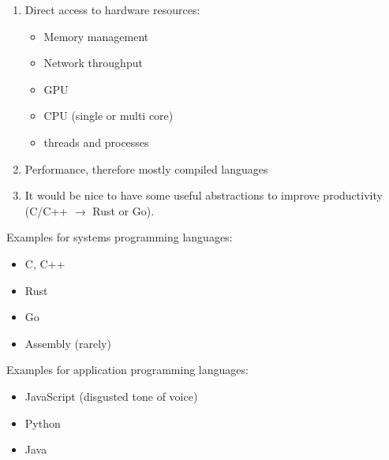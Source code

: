 \begin{enumerate}
    \item Direct access to hardware resources:
          \begin{itemize}
              \item Memory management
              \item Network throughput
              \item GPU
              \item CPU (single or multi core)
              \item threads and processes
          \end{itemize}
    \item Performance, therefore mostly compiled languages
    \item It would be nice to have some useful abstractions to improve productivity (C/C++ $\rightarrow$ Rust or Go).
\end{enumerate}

Examples for systems programming languages:

\begin{itemize}
    \item C, C++
    \item Rust
    \item Go
    \item Assembly (rarely)
\end{itemize}

Examples for application programming languages:

\begin{itemize}
    \item JavaScript (disgusted tone of voice)
    \item Python
    \item Java
\end{itemize}